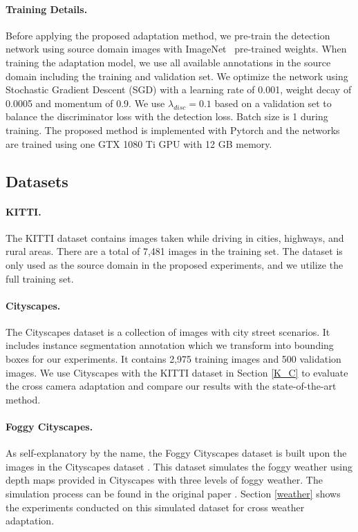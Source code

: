 \documentclass[10pt,twocolumn,letterpaper]{article}
\begin{document}
\vspace{-4mm}\paragraph{Training Details.} 
Before applying the proposed adaptation method, we pre-train the detection network using source domain images with ImageNet~\cite{deng2009imagenet} pre-trained weights.
When training the adaptation model, we use all available annotations in the source domain including the training and validation set.
We optimize the network using Stochastic Gradient Descent (SGD) with a learning rate of 0.001, weight decay of 0.0005 and momentum of 0.9. We use $\lambda_{disc}=0.1$ based on a validation set to balance the discriminator loss with the detection loss. Batch size is 1 during training.
The proposed method is implemented with Pytorch and the networks are trained using one GTX 1080 Ti GPU with 12 GB memory.



\subsection{Datasets}
\paragraph{KITTI.} 
The KITTI dataset \cite{Geiger2012CVPR} contains images taken while driving in cities, highways, and rural areas.
There are a total of 7,481 images in the training set.
The dataset is only used as the source domain in the proposed experiments, and we utilize the full training set.

\vspace{-4mm}\paragraph{Cityscapes.} 
The Cityscapes dataset \cite{Cordts2016Cityscapes} is a collection of images with city street scenarios.
It includes instance segmentation annotation which we transform into bounding boxes for our experiments.
It contains 2,975 training images and 500 validation images.
We use Cityscapes with the KITTI dataset in Section \ref{K_C} to evaluate the cross camera adaptation and compare our results with the state-of-the-art method.

\vspace{-4mm}\paragraph{Foggy Cityscapes.} 
As self-explanatory by the name, the Foggy Cityscapes dataset \cite{SDV18} is built upon the images in the Cityscapes dataset \cite{Cordts2016Cityscapes}.
This dataset simulates the foggy weather using depth maps provided in Cityscapes with three levels of foggy weather.
The simulation process can be found in the original paper \cite{SDV18}.
Section \ref{weather} shows the experiments conducted on this simulated dataset for cross weather adaptation.
\end{document}
